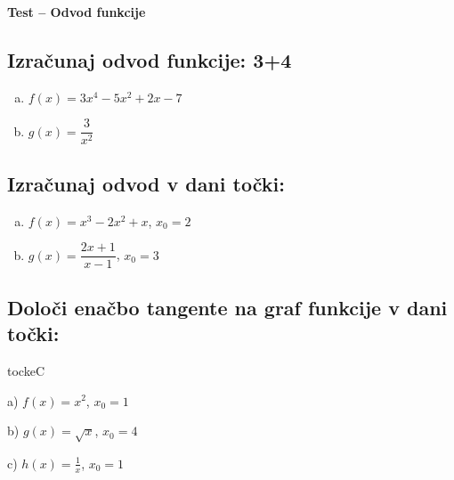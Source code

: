 \documentclass[a4paper,12pt]{article}
\newcounter{tocke}
\newcounter{tocke}
\begin{document}
\pagestyle{fancy}
\lhead{}\chead{}\rhead{}

\begin{center}
\Huge {\textbf{Test – Odvod funkcije}}
\end{center}



\def\tockeA{3+4}
\begin{crta}
\subsection*{ Izračunaj odvod funkcije: \hfill{\tockeA}}
\addtocounter{tocke}{\tockeA}

\begin{enumerate}[a.)]
\item  $f(x)=3x^4-5x^2+2x-7$

\item $g(x)=\dfrac{3}{x^2}$
\end{enumerate}
\end{crta}

\def\tockeB{2+2}
\addtocounter{tocke}{\tockeB}
\subsection{ Izračunaj odvod v dani točki:}
\begin{enumerate}[a.)]
\item  $f(x)=x^3-2x^2+x$, \quad $x_0=2$\item  $g(x)=\dfrac{2x+1}{x-1}$, \quad $x_0=3$
\end{enumerate}


\vspace{1cm}

\def\tockeC{2+2+2}
\addtocounter{tocke}{\tockeC}
\subsection{ Določi enačbo tangente na graf funkcije v dani točki:} \hfill {tockeC}

a) $f(x)=x^2$, \quad $x_0=1$

b) $g(x)=\sqrt{x}$, \quad $x_0=4$

c) $h(x)=\frac{1}{x}$, \quad $x_0=1$

\vspace{1cm}

\def\tockeD{2+2+2}
\addtocounter{tocke}{\tockeD}
\end{document}
